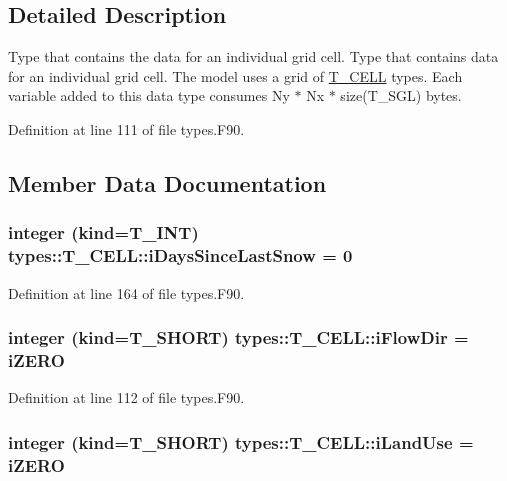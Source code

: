 \subsection{Detailed Description}
Type that contains the data for an individual grid cell. Type that contains data for an individual grid cell. The model uses a grid of \hyperlink{typetypes_1_1_t___c_e_l_l}{T\_\-CELL} types. Each variable added to this data type consumes Ny $\ast$ Nx $\ast$ size(T\_\-SGL) bytes. 

Definition at line 111 of file types.F90.



\subsection{Member Data Documentation}
\hypertarget{typetypes_1_1_t___c_e_l_l_afb9a7ef672ec4162d964751e513ff171}{
\subsubsection[{iDaysSinceLastSnow}]{\setlength{\rightskip}{0pt plus 5cm}integer (kind={\bf T\_\-INT}) {\bf types::T\_\-CELL::iDaysSinceLastSnow} = 0}}
\label{typetypes_1_1_t___c_e_l_l_afb9a7ef672ec4162d964751e513ff171}


Definition at line 164 of file types.F90.

\hypertarget{typetypes_1_1_t___c_e_l_l_a6c6f832781f3dbda7b1df22663a0c49a}{
\subsubsection[{iFlowDir}]{\setlength{\rightskip}{0pt plus 5cm}integer (kind={\bf T\_\-SHORT}) {\bf types::T\_\-CELL::iFlowDir} = {\bf iZERO}}}
\label{typetypes_1_1_t___c_e_l_l_a6c6f832781f3dbda7b1df22663a0c49a}


Definition at line 112 of file types.F90.

\hypertarget{typetypes_1_1_t___c_e_l_l_a4ac9cb6920a21ac9724c1ff5e34386b2}{
\subsubsection[{iLandUse}]{\setlength{\rightskip}{0pt plus 5cm}integer (kind={\bf T\_\-SHORT}) {\bf types::T\_\-CELL::iLandUse} = {\bf iZERO}}}
\label{typetypes_1_1_t___c_e_l_l_a4ac9cb6920a21ac9724c1ff5e34386b2}


